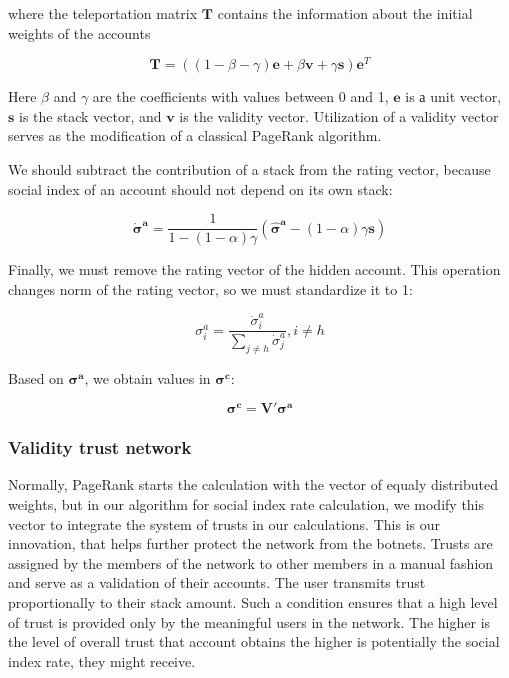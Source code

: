 \documentclass[a4paper,12pt]{article}
\begin{document}
	where the teleportation matrix $\boldsymbol{T}$ contains the information about the initial weights of the accounts
	
	\begin{equation}
	    \label{teleportation_matrix_definition}
        \boldsymbol{T} = ((1 - \beta - \gamma) \boldsymbol{e} + \beta \boldsymbol{v} + \gamma \boldsymbol{s}) \boldsymbol{e}^T
	\end{equation}
	
	Here $\beta$ and $\gamma$ are the coefficients with values between 0 and 1, $\boldsymbol{e}$ is а unit vector, $\boldsymbol{s}$ is the stack vector, and $\boldsymbol{v}$ is the validity vector. Utilization of a validity vector serves as the modification of a classical PageRank algorithm.
	
	We should subtract the contribution of a stack from the rating vector, because social index of an account should not depend on its own stack:
	
	$$
	\boldsymbol{\dot{\sigma}^a} = \frac{1}{1 - (1-\alpha) \gamma}(\boldsymbol{\hat{\sigma}^a} - (1 - \alpha) \gamma \boldsymbol{s})
	$$
	
	Finally, we must remove the rating vector of the hidden account. This operation changes norm of the rating vector, so we must standardize it to 1:
	
	$$
	\sigma^a_i = \frac{\dot{\sigma}^a_i}{\sum_{j \ne h} \dot{\sigma}^a_j}, i \ne h
	$$
	
	
	Based on $\boldsymbol{\sigma^a}$, we obtain values in $\boldsymbol{\sigma^c}$:
	
	$$
	\boldsymbol{\sigma^c} = \boldsymbol{V'}\boldsymbol{\sigma^a}
	$$
	
\subsubsection{Validity trust network}

	Normally, PageRank starts the calculation with the vector of equaly distributed weights, but in our algorithm for social index rate calculation, we modify this vector to integrate the system of trusts in our calculations. This is our innovation, that helps further protect the network from the botnets. Trusts are assigned by the members of the network to other members in a manual fashion and serve as a validation of their accounts. The user transmits trust proportionally to their stack amount. Such a condition ensures that a high level of trust is provided only by the meaningful users in the network. The higher is the level of overall trust that account obtains the higher is potentially the social index rate, they might receive.
	
\end{document}
